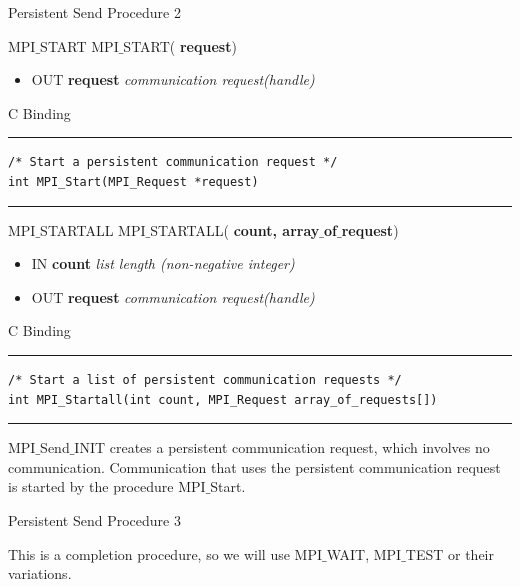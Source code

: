 \documentclass[xcolor=dvipsnames]{beamer}
\begin{document}
\begin{frame}[fragile]{Persistent Send Procedure 2}
\begin{block}{MPI$\_$START}
MPI$\_$START(\textbf{ request})
\\
\begin{itemize}
\item[] OUT \textbf{request} \: \textit{communication request(handle)}
\end{itemize}
\end{block}

C Binding
\rule{\textwidth}{1pt}
\scriptsize
\begin{verbatim}
/* Start a persistent communication request */
int MPI_Start(MPI_Request *request)
\end{verbatim}
\rule{\textwidth}{1pt}

\begin{block}{MPI$\_$STARTALL}
MPI$\_$STARTALL(\textbf{ count, array$\_$of$\_$request})
\\
\begin{itemize}
\item[] IN \textbf{count} \: \textit{list length (non-negative integer)}\\
\item[] OUT \textbf{request} \: \textit{communication request(handle)}
\end{itemize}
\end{block}

C Binding
\rule{\textwidth}{1pt}
\scriptsize
\begin{verbatim}
/* Start a list of persistent communication requests */
int MPI_Startall(int count, MPI_Request array_of_requests[])
\end{verbatim}
\rule{\textwidth}{1pt}
\end{frame}

\begin{frame}{}
\begin{outline}
\1 MPI$\_$Send$\_$INIT creates a persistent communication request, which involves no communication.
\2 Communication that uses the persistent communication request is started by the procedure MPI$\_$Start. 
\end{outline}
\end{frame}

\begin{frame}{Persistent Send Procedure 3}
\begin{outline}
\1 This is a completion procedure, so we will use MPI$\_$WAIT, MPI$\_$TEST or their variations.
\end{outline}
\end{frame}
\end{document}

